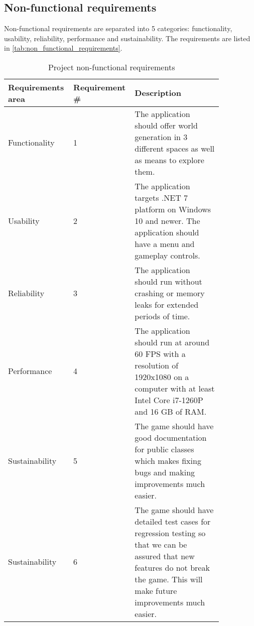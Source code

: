 \subsection{Non-functional requirements}
Non-functional requirements are separated into 5 categories: functionality, usability, reliability, performance and sustainability.
The requirements are listed in \autoref*{tab:non_functional_requirements}.

\begin{table}[H]
    \begin{tabular}{|p{0.25\linewidth}|p{0.2\linewidth}|p{0.4\linewidth}|}
        \hline
        \textbf{Requirements area} & \textbf{Requirement \#} & \textbf{Description}                                                                                                                  \\ \hline
        Functionality              & 1                       & The application should offer world generation in 3 different spaces as well as means to explore them.                                 \\ \hline
        Usability                  & 2                       & The application targets .NET 7 platform on Windows 10 and newer. The application should have a menu and gameplay controls.            \\ \hline
        Reliability                & 3                       & The application should run without crashing or memory leaks for extended periods of time.                                             \\ \hline
        Performance                & 4                       & The application should run at around 60 FPS with a resolution of 1920x1080 on a computer with at least Intel Core i7-1260P and 16 GB of RAM. \\ \hline
        Sustainability             & 5                       & The game should have good documentation for public classes which makes fixing bugs and making improvements much easier.                                                  \\ \hline
        Sustainability             & 6                       & The game should have detailed test cases for regression testing so that we can be assured that new features do not break the game. This will make future improvements much easier.                                                  \\ \hline
    \end{tabular}
    \caption{Project non-functional requirements}
    \label{tab:non_functional_requirements}
\end{table}